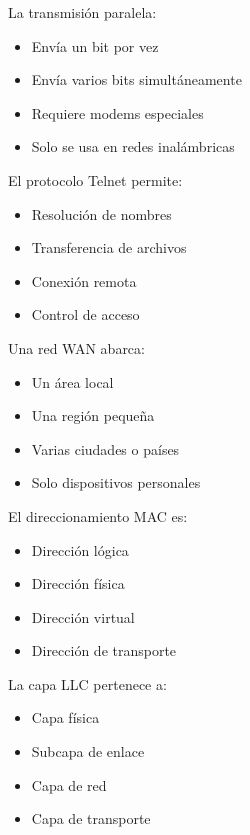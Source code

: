 \documentclass[11pt]{article}
\begin{document}
La transmisión paralela:

\begin{itemize}
\item Envía un bit por vez

\item Envía varios bits simultáneamente

\item Requiere modems especiales

\item Solo se usa en redes inalámbricas
\end{itemize}

El protocolo Telnet permite:

\begin{itemize}
\item Resolución de nombres

\item Transferencia de archivos

\item Conexión remota

\item Control de acceso
\end{itemize}

Una red WAN abarca:

\begin{itemize}
\item Un área local

\item Una región pequeña

\item Varias ciudades o países

\item Solo dispositivos personales
\end{itemize}

El direccionamiento MAC es:

\begin{itemize}
\item Dirección lógica

\item Dirección física

\item Dirección virtual

\item Dirección de transporte
\end{itemize}

La capa LLC pertenece a:

\begin{itemize}
\item Capa física

\item Subcapa de enlace

\item Capa de red

\item Capa de transporte
\end{itemize}
\end{document}

